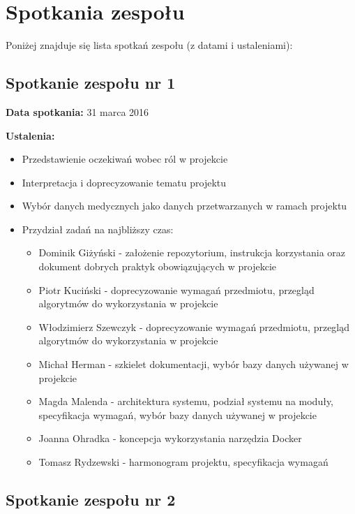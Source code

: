 \chapter{Spotkania zespołu}
\label{ap:2}

Poniżej znajduje się lista spotkań zespołu (z datami i ustaleniami):

\section{Spotkanie zespołu nr 1}

\textbf{Data spotkania:}  31 marca 2016

\textbf{Ustalenia:}

\begin{itemize}
\item Przedstawienie oczekiwań wobec ról w projekcie
\item Interpretacja i doprecyzowanie tematu projektu
\item Wybór danych medycznych jako danych przetwarzanych w ramach projektu
\item Przydział zadań na najbliższy czas:
	\begin{itemize}
	\item Dominik Giżyński - założenie repozytorium, instrukcja korzystania oraz dokument dobrych praktyk obowiązujących w projekcie
	\item Piotr Kuciński - doprecyzowanie wymagań przedmiotu, przegląd algorytmów do wykorzystania w projekcie
	\item Włodzimierz Szewczyk - doprecyzowanie wymagań przedmiotu, przegląd algorytmów do wykorzystania w projekcie
	\item Michał Herman - szkielet dokumentacji, wybór bazy danych używanej w projekcie
	\item Magda Malenda - architektura systemu, podział systemu na moduły, specyfikacja wymagań, wybór bazy danych używanej w projekcie
	\item Joanna Ohradka - koncepcja wykorzystania narzędzia Docker
	\item Tomasz Rydzewski - harmonogram projektu, specyfikacja wymagań
	\end{itemize}
\end{itemize}



\section{Spotkanie zespołu nr 2}

